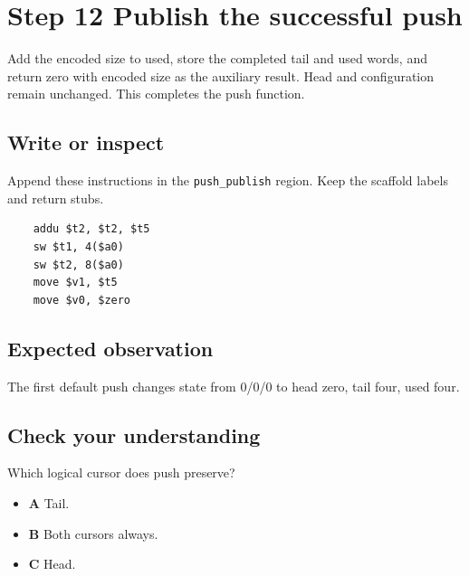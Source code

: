 \section{Step 12 Publish the successful push}\label{ring-s12}

Add the encoded size to used, store the completed tail and used words, and return zero with encoded size as the auxiliary result. Head and configuration remain unchanged. This completes the push function.

\subsection{Write or inspect}
Append these instructions in the \texttt{push\_publish} region. Keep the scaffold labels and return stubs.

\begin{verbatim}
    addu $t2, $t2, $t5
    sw $t1, 4($a0)
    sw $t2, 8($a0)
    move $v1, $t5
    move $v0, $zero
\end{verbatim}

\subsection{Expected observation}
The first default push changes state from 0/0/0 to head zero, tail four, used four.

\subsection{Check your understanding}
Which logical cursor does push preserve?

\begin{itemize}
  \item \textbf{A} Tail.
  \item \textbf{B} Both cursors always.
  \item \textbf{C} Head.
\end{itemize}
